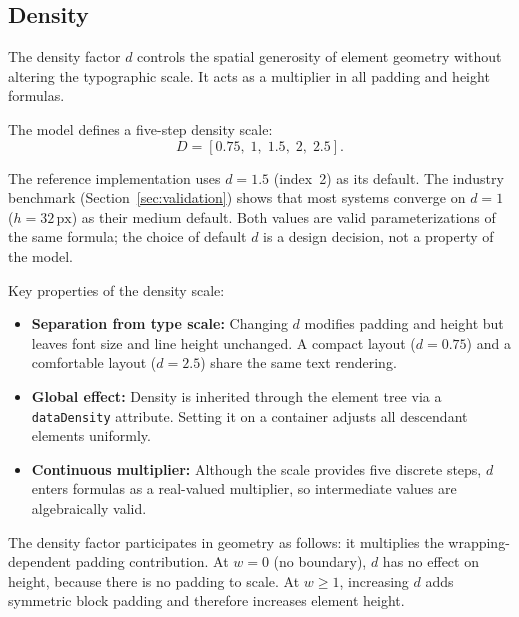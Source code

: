 \subsection{Density}
\label{sec:density}

The density factor $d$ controls the spatial generosity of element geometry without altering the typographic scale. It acts as a multiplier in all padding and height formulas.

The model defines a five-step density scale:
\begin{equation}
D = [0.75,\; 1,\; 1.5,\; 2,\; 2.5].
\end{equation}

The reference implementation uses $d = 1.5$ (index~2) as its default. The industry benchmark (Section~\ref{sec:validation}) shows that most systems converge on $d = 1$ ($h = 32\,\text{px}$) as their medium default. Both values are valid parameterizations of the same formula; the choice of default $d$ is a design decision, not a property of the model.

Key properties of the density scale:

\begin{itemize}
  \item \textbf{Separation from type scale:} Changing $d$ modifies padding and height but leaves font size and line height unchanged. A compact layout ($d = 0.75$) and a comfortable layout ($d = 2.5$) share the same text rendering.

  \item \textbf{Global effect:} Density is inherited through the element tree via a \texttt{dataDensity} attribute. Setting it on a container adjusts all descendant elements uniformly.

  \item \textbf{Continuous multiplier:} Although the scale provides five discrete steps, $d$ enters formulas as a real-valued multiplier, so intermediate values are algebraically valid.
\end{itemize}

The density factor participates in geometry as follows: it multiplies the wrapping-dependent padding contribution. At $w = 0$ (no boundary), $d$ has no effect on height, because there is no padding to scale. At $w \ge 1$, increasing $d$ adds symmetric block padding and therefore increases element height.

